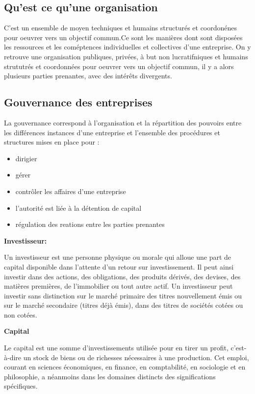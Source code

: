 \documentclass[12pt]{article}
\begin{document}
\subsection{Qu'est ce qu'une organisation}
C'est un ensemble de moyen techniques et humains structurés et coordonénes pour oeuvrer vers un objectif commun.Ce sont les manières dont sont disposées les ressources et les coméptences individuelles et collectives d'une entreprise. On y retrouve une organisation publiques, privées, à but non lucratifniques et humains strututrés et coordonnées pour oeuvrer vers un objectif commun, il y a alors plusieurs parties prenantes, avec des intérêts divergents.

\subsection{Gouvernance des entreprises}
La gouvernance correspond à l'organisation et la répartition des pouvoirs entre les différences instances d'une entreprise et l'ensemble des procédures et structures mises en place pour :
\begin{itemize}
\item dirigier
\item gérer
\item contrôler les affaires d'une entreprise
\item l'autorité est liée à la détention de capital
\item régulation des reations entre  les parties prenantes
\end{itemize}

\textbf{Investisseur: }

\begin{minipage}{0.8\textwidth}
Un investisseur est une personne physique ou morale qui alloue une part de capital disponible dans l'attente d'un retour sur investissement. Il peut ainsi investir dans des actions, des obligations, des produits dérivés, des devises, des matières premières, de l'immobilier ou tout autre actif. Un investisseur peut investir sans distinction sur le marché primaire des titres nouvellement émis ou sur le marché secondaire (titres déjà émis), dans des titres de sociétés cotées ou non cotées.\\
\end{minipage}

\textbf{Capital}

\begin{minipage}{0.8\textwidth}
Le capital est une somme d'investissements utilisée pour en tirer un profit, c'est-à-dire un stock de biens ou de richesses nécessaires à une production. Cet emploi, courant en sciences économiques, en finance, en comptabilité, en sociologie et en philosophie, a néanmoins dans les domaines distincts des significations spécifiques. \\
\end{minipage}
\end{document}
